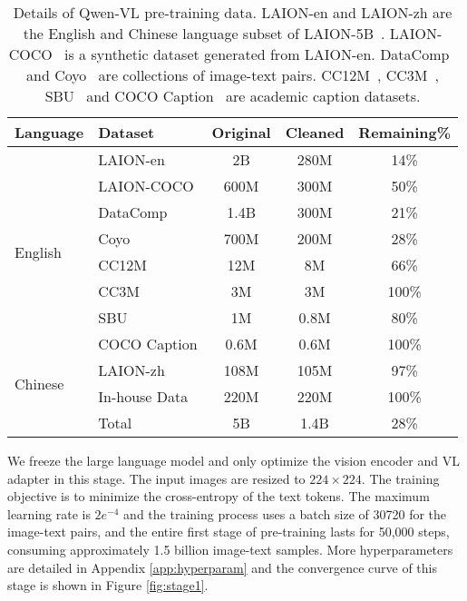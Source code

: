 \documentclass{article}
\newcommand{\tablestyle}[2]{\setlength{\tabcolsep}{#1}\renewcommand{\arraystretch}{#2}\centering\footnotesize}
\begin{document}
\begin{table}[ht]
    \centering
    \caption{Details of Qwen-VL pre-training data. LAION-en and LAION-zh are the English 
 and Chinese language subset of LAION-5B~\citep{laion5b}. LAION-COCO~\citep{laioncoco} is a synthetic dataset generated from LAION-en. DataComp~\citep{datacomp} and Coyo~\citep{coyo} are collections of image-text pairs. CC12M~\citep{cc12m}, CC3M~\citep{cc3m}, SBU~\citep{sbu} and COCO Caption~\citep{cococaption} are academic caption datasets.} 
    \tablestyle{6pt}{1.1}
    \begin{tabular}{ll ccc}
         \toprule
         \textbf{Language} & \textbf{Dataset} & \textbf{Original} & \textbf{Cleaned} & \textbf{Remaining\%} \\
         \midrule
         \multirow{8}{*}{English} & LAION-en     & 2B       & 280M & 14\% \\
         & LAION-COCO   & 600M     & 300M & 50\% \\
         & DataComp     & 1.4B     & 300M & 21\% \\
         & Coyo         & 700M     & 200M & 28\% \\
         & CC12M        & 12M      & 8M   & 66\% \\
         & CC3M         & 3M       & 3M   & 100\% \\
         & SBU          & 1M       & 0.8M & 80\% \\
         & COCO Caption & 0.6M     & 0.6M & 100\% \\
         \midrule
         \multirow{2}{*}{Chinese} & LAION-zh     & 108M     & 105M & 97\% \\
         & \color{dt}In-house Data & \color{dt}220M & \color{dt}220M & \color{dt}100\% \\
         \midrule
          & Total        & 5B     & 1.4B & 28\% \\
         \bottomrule
    \end{tabular}
    \label{tab:pretraining_data}
\end{table}

We freeze the large language model and only optimize the vision encoder and VL adapter in this stage. The input images are resized to $224 \times 224$. The training objective is to minimize the cross-entropy of the text tokens. The maximum learning rate is $2e^{-4}$ and the training process uses a batch size of 30720 for the image-text pairs, and the entire first stage of pre-training lasts for 50,000 steps, consuming approximately 1.5 billion image-text samples. More hyperparameters are detailed in Appendix \ref{app:hyperparam} and the convergence curve of this stage is shown in Figure \ref{fig:stage1}.
\end{document}
